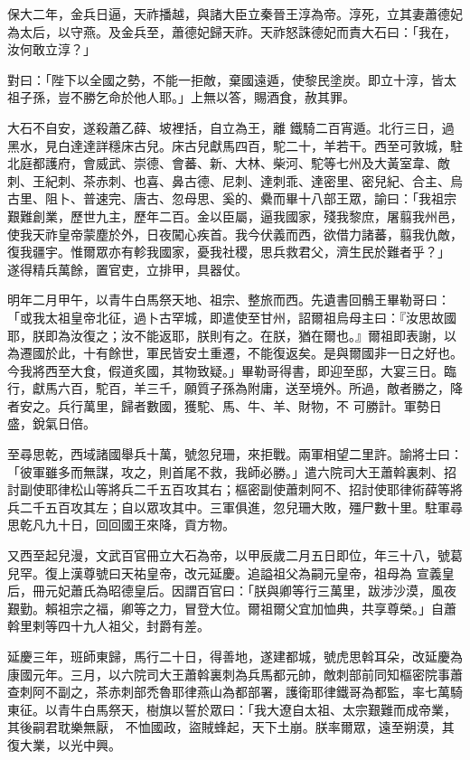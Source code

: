 \begin{pinyinscope}
 保大二年，金兵日逼，天祚播越，與諸大臣立秦晉王淳為帝。淳死，立其妻蕭德妃為太后，以守燕。及金兵至，蕭德妃歸天祚。天祚怒誅德妃而責大石曰：「我在，汝何敢立淳？」



 對曰：「陛下以全國之勢，不能一拒敵，棄國遠遁，使黎民塗炭。即立十淳，皆太祖子孫，豈不勝乞命於他人耶。」上無以答，賜酒食，赦其罪。



 大石不自安，遂殺蕭乙薛、坡裡括，自立為王，離
 鐵騎二百宵遁。北行三日，過黑水，見白達達詳穩床古兒。床古兒獻馬四百，駝二十，羊若干。西至可敦城，駐北庭都護府，會威武、崇德、會蕃、新、大林、柴河、駝等七州及大黃室韋、敵刺、王紀刺、茶赤刺、也喜、鼻古德、尼刺、達刺乖、達密里、密兒紀、合主、烏古里、阻卜、普速完、唐古、忽母思、奚的、纍而畢十八部王眾，諭曰：「我祖宗艱難創業，歷世九主，歷年二百。金以臣屬，逼我國家，殘我黎庶，屠翦我州邑，使我天祚皇帝蒙塵於外，日夜闖心疾首。我今伏義而西，欲借力諸蕃，翦我仇敵，復我疆宇。惟爾眾亦有軫我國家，憂我社稷，思兵救君父，濟生民於難者乎？」
 遂得精兵萬餘，置官吏，立排甲，具器仗。



 明年二月甲午，以青牛白馬祭天地、祖宗、整旅而西。先遺書回鶻王畢勒哥曰：「或我太祖皇帝北征，過卜古罕城，即遣使至甘州，詔爾祖烏母主曰：『汝思故國耶，朕即為汝復之；汝不能返耶，朕則有之。在朕，猶在爾也。』爾祖即表謝，以為遷國於此，十有餘世，軍民皆安土重遷，不能復返矣。是與爾國非一日之好也。今我將西至大食，假道炙國，其物致疑。」畢勒哥得書，即迎至邸，大宴三日。臨行，獻馬六百，駝百，羊三千，願質子孫為附庸，送至境外。所過，敵者勝之，降者安之。兵行萬里，歸者數國，獲駝、馬、牛、羊、財物，不
 可勝計。軍勢日盛，銳氣日倍。



 至尋思乾，西域諸國舉兵十萬，號忽兒珊，來拒戰。兩軍相望二里許。諭將士曰：「彼軍雖多而無謀，攻之，則首尾不救，我師必勝。」遣六院司大王蕭斡裏刺、招討副使耶律松山等將兵二千五百攻其右；樞密副使蕭刺阿不、招討使耶律術薛等將兵二千五百攻其左；自以眾攻其中。三軍俱進，忽兒珊大敗，殭尸數十里。駐軍尋思乾凡九十日，回回國王來降，貢方物。



 又西至起兒漫，文武百官冊立大石為帝，以甲辰歲二月五日即位，年三十八，號葛兒罕。復上漢尊號曰天祐皇帝，改元延慶。追謚祖父為嗣元皇帝，祖母為
 宣義皇后，冊元妃蕭氏為昭德皇后。因謂百官曰：「朕與卿等行三萬里，跋涉沙漠，風夜艱勤。賴祖宗之福，卿等之力，冒登大位。爾祖爾父宜加恤典，共享尊榮。」自蕭斡里剌等四十九人祖父，封爵有差。



 延慶三年，班師東歸，馬行二十日，得善地，遂建都城，號虎思斡耳朵，改延慶為康國元年。三月，以六院司大王蕭斡裏刺為兵馬都元帥，敵刺部前同知樞密院事蕭查刺阿不副之，茶赤刺部禿魯耶律燕山為都部署，護衛耶律鐵哥為都監，率七萬騎東征。以青牛白馬祭天，樹旗以誓於眾曰：「我大遼自太祖、太宗艱難而成帝業，其後嗣君耽樂無厭，
 不恤國政，盜賊蜂起，天下土崩。朕率爾眾，遠至朔漠，其復大業，以光中興。




\end{pinyinscope}
